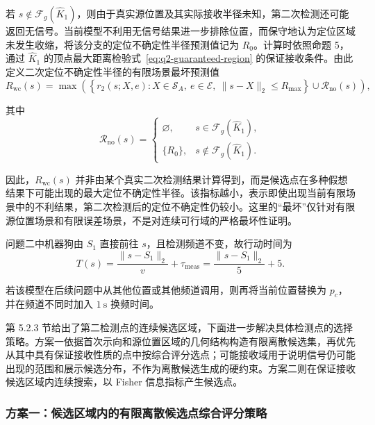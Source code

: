 \documentclass[withoutpreface,bwprint]{cumcmthesis}
\begin{document}
若 $s\notin\mathcal F_g(\widehat K_1)$，则由于真实源位置及其实际接收半径未知，第二次检测还可能返回无信号。当前模型不利用无信号结果进一步排除位置，而保守地认为定位区域未发生收缩，将该分支的定位不确定性半径预测值记为 $R_0$。计算时依照命题 5，通过 $\widehat K_1$ 的顶点最大距离检验式~\eqref{eq:q2-guaranteed-region} 的保证接收条件。由此定义二次定位不确定性半径的有限场景最坏预测值
\begin{equation}
  R_{\mathrm{wc}}(s)
  =\max\left(
  \left\{
  r_2(s;X,e):
  X\in\mathcal S_A,\ e\in\mathcal E,\
  \|s-X\|_2\leq R_{\max}
  \right\}
  \cup\mathcal R_{\mathrm{no}}(s)
  \right),
  \label{eq:q2-worst-radius}
\end{equation}

其中
\begin{equation}
  \mathcal R_{\mathrm{no}}(s)=
  \begin{cases}
    \varnothing, & s\in\mathcal F_g(\widehat K_1),\\
    \{R_0\}, & s\notin\mathcal F_g(\widehat K_1).
  \end{cases}
\end{equation}

因此，$R_{\mathrm{wc}}(s)$ 并非由某个真实二次检测结果计算得到，而是候选点在多种假想结果下可能出现的最大定位不确定性半径。该指标越小，表示即使出现当前有限场景中的不利结果，第二次检测后的定位不确定性仍较小。这里的“最坏”仅针对有限源位置场景和有限误差场景，不是对连续可行域的严格最坏性证明。

问题二中机器狗由 $S_1$ 直接前往 $s$，且检测频道不变，故行动时间为
\begin{equation}
  T(s)=\frac{\|s-S_1\|_2}{v}+\tau_{\mathrm{meas}}
  =\frac{\|s-S_1\|_2}{5}+5.
  \label{eq:q2-action-time}
\end{equation}

若该模型在后续问题中从其他位置或其他频道调用，则再将当前位置替换为 $p_c$，并在频道不同时加入 $1\ \mathrm{s}$ 换频时间。

第 5.2.3 节给出了第二检测点的连续候选区域，下面进一步解决具体检测点的选择策略。方案一依据首次示向和源位置区域的几何结构构造有限离散候选集，再优先从其中具有保证接收性质的点中按综合评分选点；可能接收域用于说明信号仍可能出现的范围和展示候选分布，不作为离散候选生成的硬约束。方案二则在保证接收候选区域内连续搜索，以 Fisher 信息指标产生候选点。

\subsubsection{方案一：候选区域内的有限离散候选点综合评分策略}
\end{document}
